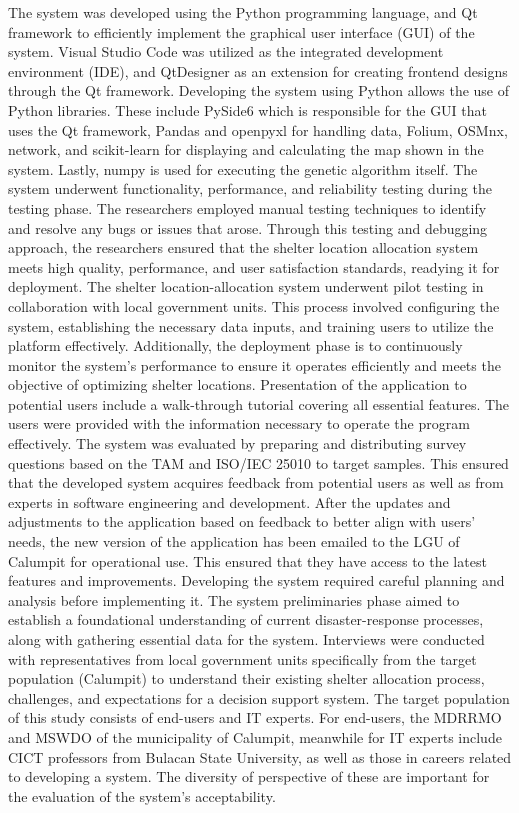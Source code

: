 \documentclass[12pt,a4paper,]{article}
\begin{document}
	The system was developed using the Python programming language, and Qt framework to efficiently implement the graphical user interface (GUI) of the system. Visual Studio Code was utilized as the integrated development environment (IDE), and QtDesigner as an extension for creating frontend designs through the Qt framework.
	Developing the system using Python allows the use of Python libraries. These include PySide6 which is responsible for the GUI that uses the Qt framework, Pandas and openpyxl for handling data, Folium, OSMnx, network, and scikit-learn for displaying and calculating the map shown in the system. Lastly, numpy is used for executing the genetic algorithm itself.
	The system underwent functionality, performance, and reliability testing during the testing phase. The researchers employed manual testing techniques to identify and resolve any bugs or issues that arose. Through this testing and debugging approach, the researchers ensured that the shelter location allocation system meets high quality, performance, and user satisfaction standards, readying it for deployment.
	The shelter location-allocation system underwent pilot testing in collaboration with local government units. This process involved configuring the system, establishing the necessary data inputs, and training users to utilize the platform effectively. Additionally, the deployment phase is to continuously monitor the system’s performance to ensure it operates efficiently and meets the objective of optimizing shelter locations. Presentation of the application to potential users include a walk-through tutorial covering all essential features. The users were provided with the information necessary to operate the program effectively.
	The system was evaluated by preparing and distributing survey questions based on the TAM and ISO/IEC 25010 to target samples. This ensured that the developed system acquires feedback from potential users as well as from experts in software engineering and development.
	After the updates and adjustments to the application based on feedback to better align with users’ needs, the new version of the application has been emailed to the LGU of Calumpit for operational use. This ensured that they have access to the latest features and improvements.
	Developing the system required careful planning and analysis before implementing it. The system preliminaries phase aimed to establish a foundational understanding of current disaster-response processes, along with gathering essential data for the system. Interviews were conducted with representatives from local government units specifically from the target population (Calumpit) to understand their existing shelter allocation process, challenges, and expectations for a decision support system.
	The target population of this study consists of end-users and IT experts. For end-users, the MDRRMO and MSWDO of the municipality of Calumpit, meanwhile for IT experts include CICT professors from Bulacan State University, as well as those in careers related to developing a system. The diversity of perspective of these are important for the evaluation of the system’s acceptability.
	
\end{document}
